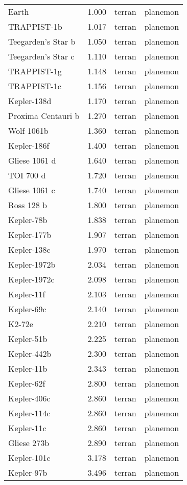 \documentclass[
  letterpaper,
]{book}
\begin{document}
\begin{longtable}[]{@{}llll@{}}
Earth & 1.000 & terran & planemon \\
TRAPPIST-1b & 1.017 & terran & planemon \\
Teegarden's Star b & 1.050 & terran & planemon \\
Teegarden's Star c & 1.110 & terran & planemon \\
TRAPPIST-1g & 1.148 & terran & planemon \\
TRAPPIST-1c & 1.156 & terran & planemon \\
Kepler-138d & 1.170 & terran & planemon \\
Proxima Centauri b & 1.270 & terran & planemon \\
Wolf 1061b & 1.360 & terran & planemon \\
Kepler-186f & 1.400 & terran & planemon \\
Gliese 1061 d & 1.640 & terran & planemon \\
TOI 700 d & 1.720 & terran & planemon \\
Gliese 1061 c & 1.740 & terran & planemon \\
Ross 128 b & 1.800 & terran & planemon \\
Kepler-78b & 1.838 & terran & planemon \\
Kepler-177b & 1.907 & terran & planemon \\
Kepler-138c & 1.970 & terran & planemon \\
Kepler-1972b & 2.034 & terran & planemon \\
Kepler-1972c & 2.098 & terran & planemon \\
Kepler-11f & 2.103 & terran & planemon \\
Kepler-69c & 2.140 & terran & planemon \\
K2-72e & 2.210 & terran & planemon \\
Kepler-51b & 2.225 & terran & planemon \\
Kepler-442b & 2.300 & terran & planemon \\
Kepler-11b & 2.343 & terran & planemon \\
Kepler-62f & 2.800 & terran & planemon \\
Kepler-406c & 2.860 & terran & planemon \\
Kepler-114c & 2.860 & terran & planemon \\
Kepler-11c & 2.860 & terran & planemon \\
Gliese 273b & 2.890 & terran & planemon \\
Kepler-101c & 3.178 & terran & planemon \\
Kepler-97b & 3.496 & terran & planemon \\

\end{longtable}
\end{document}
